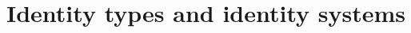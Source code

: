 \documentclass[hott-all.tex]{subfiles}
\begin{document}
\section{Identity types and identity systems}
% 
% 
% 
% 
\end{document}
